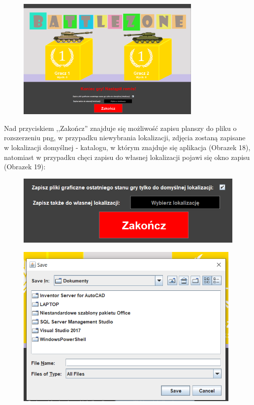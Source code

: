 \documentclass{article}
\begin{document}
\begin{figure} [hbt!]
    \centering
    \includegraphics[width=9cm]{koniec_2.png}
\end{figure}

Nad przyciskiem ,,Zakończ'' znajduje się możliwość zapisu planszy do pliku o rozszerzeniu png, w przypadku niewybrania lokalizacji, zdjęcia zostaną zapisane w lokalizacji domyślnej - katalogu, w którym znajduje się aplikacja (Obrazek 18), natomiast w przypadku chęci zapisu do własnej lokalizacji pojawi się okno zapisu (Obrazek 19):
\begin{figure} [hbt!]
    \centering
    \includegraphics[width=12cm]{zapis_do_pliku.png}
\end{figure}

\begin{figure} [hbt!]
    \centering
    \includegraphics[width=11cm]{zapis.png}
\end{figure}
\end{document}
